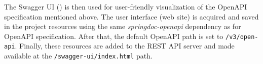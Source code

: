 The Swagger UI () is then used for user-friendly visualization of the OpenAPI specification mentioned above.
The user interface (web site) is acquired and saved in the project resources using the same \emph{springdoc-openapi} dependency as for OpenAPI specification. After that, the default OpenAPI path is set to \texttt{/v3/open-api}. Finally, these resources are added to the REST API server and made available at the \texttt{/swagger-ui/index.html} path.
